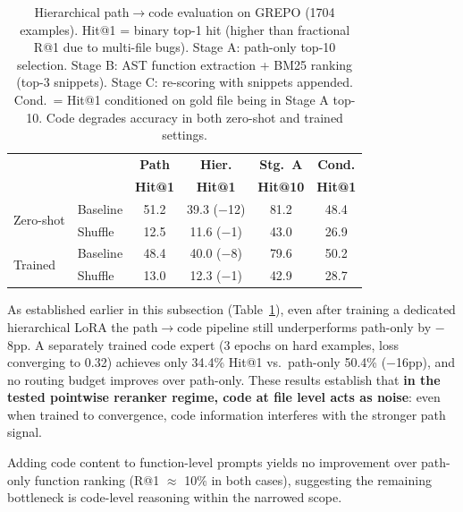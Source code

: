 \documentclass{article}
\begin{document}
\begin{table}[t]
\centering
\caption{Hierarchical path$\to$code evaluation on GREPO (1704 examples). Hit@1 = binary top-1 hit (higher than fractional R@1 due to multi-file bugs). Stage A: path-only top-10 selection. Stage B: AST function extraction + BM25 ranking (top-3 snippets). Stage C: re-scoring with snippets appended. Cond.\ = Hit@1 conditioned on gold file being in Stage A top-10. Code degrades accuracy in both zero-shot and trained settings.}
\label{tab:hierarchical_eval}
\small
\begin{tabular}{llcccc}
\toprule
 & & \textbf{Path} & \textbf{Hier.} & \textbf{Stg.\ A} & \textbf{Cond.} \\
 & & \textbf{Hit@1} & \textbf{Hit@1} & \textbf{Hit@10} & \textbf{Hit@1} \\
\midrule
\multirow{2}{*}{Zero-shot}
 & Baseline & 51.2 & 39.3 ($-$12) & 81.2 & 48.4 \\
 & Shuffle  & 12.5 & 11.6 ($-$1) & 43.0 & 26.9 \\
\midrule
\multirow{2}{*}{Trained}
 & Baseline & 48.4 & 40.0 ($-$8) & 79.6 & 50.2 \\
 & Shuffle  & 13.0 & 12.3 ($-$1) & 42.9 & 28.7 \\
\bottomrule
\end{tabular}
\end{table}

As established earlier in this subsection (Table~\ref{tab:hierarchical_eval}), even after training a dedicated hierarchical LoRA the path$\to$code pipeline still underperforms path-only by $-$8pp.
A separately trained code expert (3 epochs on hard examples, loss converging to 0.32) achieves only 34.4\% Hit@1 vs.\ path-only 50.4\% ($-$16pp), and no routing budget improves over path-only.
These results establish that \textbf{in the tested pointwise reranker regime, code at file level acts as noise}: even when trained to convergence, code information interferes with the stronger path signal.

Adding code content to function-level prompts yields no improvement over path-only function ranking (R@1 $\approx$ 10\% in both cases), suggesting the remaining bottleneck is code-level reasoning within the narrowed scope.
\end{document}
